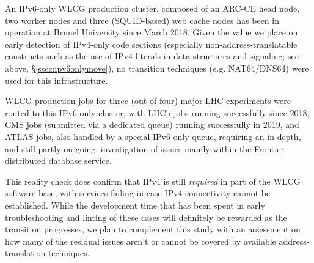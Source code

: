 %
An IPv6-only WLCG production cluster, composed of an ARC-CE head node,
two worker nodes and three (SQUID-based) web cache nodes has been
in operation at Brunel University since March 2018. Given the value
we place on early detection of IPv4-only code sections (especially
non-address-translatable constructs such as the use of IPv4 literals in
data structures and signaling; see above, \S\ref{ssec:ipv6onlymove}),
no transition techniques (e.g. NAT64/DNS64) were used for this
infrastructure.
\par
WLCG production jobs for three (out of four) major LHC experiments were routed
to this IPv6-only cluster, with LHCb jobs running successfully since
2018, CMS jobs (submitted via a dedicated queue) running successfully in 2019,
and ATLAS jobs, also handled by a special IPv6-only queue, requiring an
in-depth, and still partly on-going, investigation of issues mainly within the
Frontier \cite{frontier} distributed database
service.
\par
This reality check does confirm that IPv4 is still {\it required} in part
of the WLCG software base, with services failing in case IPv4 connectivity
cannot be established. While the development time that has been spent in 
early troubleshooting and linting of these cases will definitely be rewarded
as the transition progresses, we plan to complement this study with 
an assessment on how many of the residual issues aren't or cannot be covered
by available address-translation techniques.


